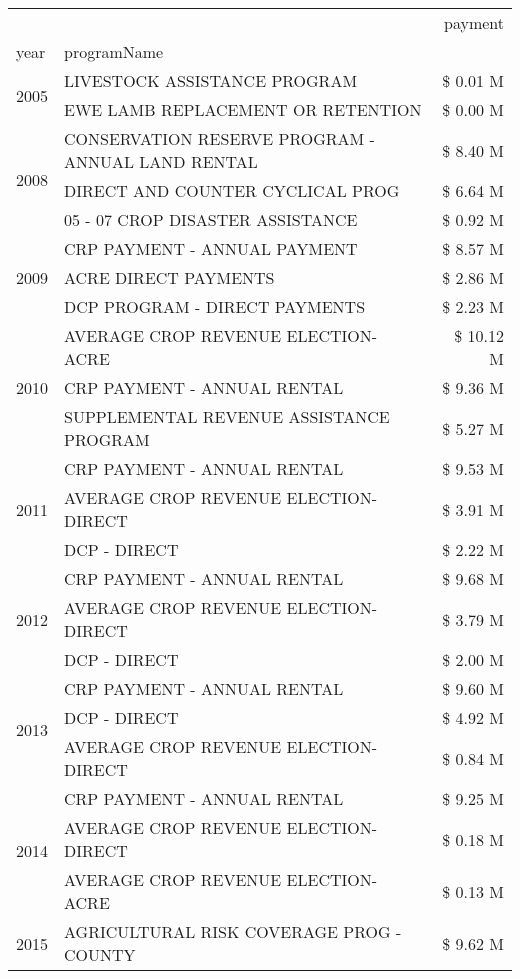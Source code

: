 \begin{tabular}{llr}
\toprule
 &  & payment \\
year & programName &  \\
\midrule
\multirow[t]{2}{*}{2005} & LIVESTOCK ASSISTANCE PROGRAM & \$ 0.01 M \\
 & EWE LAMB REPLACEMENT OR RETENTION & \$ 0.00 M \\
\cline{1-3}
\multirow[t]{3}{*}{2008} & CONSERVATION RESERVE PROGRAM - ANNUAL LAND RENTAL & \$ 8.40 M \\
 & DIRECT AND COUNTER CYCLICAL PROG & \$ 6.64 M \\
 & 05 - 07 CROP DISASTER ASSISTANCE & \$ 0.92 M \\
\cline{1-3}
\multirow[t]{3}{*}{2009} & CRP PAYMENT - ANNUAL PAYMENT & \$ 8.57 M \\
 & ACRE DIRECT PAYMENTS & \$ 2.86 M \\
 & DCP PROGRAM - DIRECT PAYMENTS & \$ 2.23 M \\
\cline{1-3}
\multirow[t]{3}{*}{2010} & AVERAGE CROP REVENUE ELECTION-ACRE & \$ 10.12 M \\
 & CRP PAYMENT - ANNUAL RENTAL & \$ 9.36 M \\
 & SUPPLEMENTAL REVENUE ASSISTANCE PROGRAM & \$ 5.27 M \\
\cline{1-3}
\multirow[t]{3}{*}{2011} & CRP PAYMENT - ANNUAL RENTAL & \$ 9.53 M \\
 & AVERAGE CROP REVENUE ELECTION-DIRECT & \$ 3.91 M \\
 & DCP - DIRECT & \$ 2.22 M \\
\cline{1-3}
\multirow[t]{3}{*}{2012} & CRP PAYMENT - ANNUAL RENTAL & \$ 9.68 M \\
 & AVERAGE CROP REVENUE ELECTION-DIRECT & \$ 3.79 M \\
 & DCP - DIRECT & \$ 2.00 M \\
\cline{1-3}
\multirow[t]{3}{*}{2013} & CRP PAYMENT - ANNUAL RENTAL & \$ 9.60 M \\
 & DCP - DIRECT & \$ 4.92 M \\
 & AVERAGE CROP REVENUE ELECTION-DIRECT & \$ 0.84 M \\
\cline{1-3}
\multirow[t]{3}{*}{2014} & CRP PAYMENT - ANNUAL RENTAL & \$ 9.25 M \\
 & AVERAGE CROP REVENUE ELECTION-DIRECT & \$ 0.18 M \\
 & AVERAGE CROP REVENUE ELECTION-ACRE & \$ 0.13 M \\
\cline{1-3}
\multirow[t]{3}{*}{2015} & AGRICULTURAL RISK COVERAGE PROG - COUNTY & \$ 9.62 M \\

\end{tabular}

